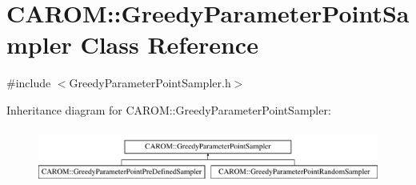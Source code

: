 \hypertarget{class_c_a_r_o_m_1_1_greedy_parameter_point_sampler}{\section{C\-A\-R\-O\-M\-:\-:Greedy\-Parameter\-Point\-Sampler Class Reference}
\label{class_c_a_r_o_m_1_1_greedy_parameter_point_sampler}
}


{\ttfamily \#include $<$Greedy\-Parameter\-Point\-Sampler.\-h$>$}

Inheritance diagram for C\-A\-R\-O\-M\-:\-:Greedy\-Parameter\-Point\-Sampler\-:\begin{figure}[H]
\begin{center}
\leavevmode
\includegraphics[height=1.800643cm]{class_c_a_r_o_m_1_1_greedy_parameter_point_sampler}
\end{center}
\end{figure}
